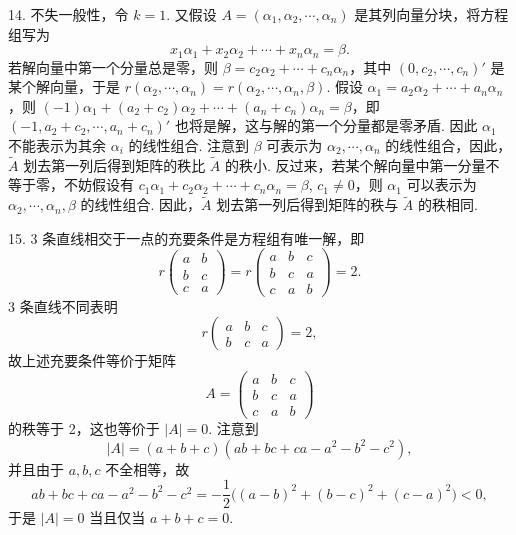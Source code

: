 \documentclass[UTF8,12pt,a4paper,fontset=fandol]{ctexart}
\begin{document}
14. 不失一般性，令 $k=1$. 又假设 $A=(\alpha_1,\alpha_2,\cdots,\alpha_n)$ 是其列向量分块，将方程组写为
\[
x_1\alpha_1+x_2\alpha_2+\cdots+x_n\alpha_n=\beta.
\]
若解向量中第一个分量总是零，则 $\beta=c_2\alpha_2+\cdots+c_n\alpha_n$，其中 $(0,c_2,\cdots,c_n)'$ 是某个解向量，于是 $r(\alpha_2,\cdots,\alpha_n)=r(\alpha_2,\cdots,\alpha_n,\beta)$. 假设 $\alpha_1=a_2\alpha_2+\cdots+a_n\alpha_n$，则 $(-1)\alpha_1+(a_2+c_2)\alpha_2+\cdots+(a_n+c_n)\alpha_n=\beta$，即 $(-1,a_2+c_2,\cdots,a_n+c_n)'$ 也将是解，这与解的第一个分量都是零矛盾. 因此 $\alpha_1$ 不能表示为其余 $\alpha_i$ 的线性组合. 注意到 $\beta$ 可表示为 $\alpha_2,\cdots,\alpha_n$ 的线性组合，因此，$\widetilde{A}$ 划去第一列后得到矩阵的秩比 $\widetilde{A}$ 的秩小. 反过来，若某个解向量中第一分量不等于零，不妨假设有 $c_1\alpha_1+c_2\alpha_2+\cdots+c_n\alpha_n=\beta$, $c_1\ne 0$，则 $\alpha_1$ 可以表示为 $\alpha_2,\cdots,\alpha_n,\beta$ 的线性组合. 因此，$\widetilde{A}$ 划去第一列后得到矩阵的秩与 $\widetilde{A}$ 的秩相同.

15. 3 条直线相交于一点的充要条件是方程组有唯一解，即
\[
r\begin{pmatrix}
a&b\\
b&c\\
c&a
\end{pmatrix}
=
r\begin{pmatrix}
a&b&c\\
b&c&a\\
c&a&b
\end{pmatrix}
=2.
\]
3 条直线不同表明
\[
r\begin{pmatrix}
a&b&c\\
b&c&a
\end{pmatrix}=2,
\]
故上述充要条件等价于矩阵
\[
A=\begin{pmatrix}
a&b&c\\
b&c&a\\
c&a&b
\end{pmatrix}
\]
的秩等于 2，这也等价于 $|A|=0$. 注意到
\[
|A|=(a+b+c)(ab+bc+ca-a^2-b^2-c^2),
\]
并且由于 $a,b,c$ 不全相等，故
\[
ab+bc+ca-a^2-b^2-c^2=-\frac12\bigl((a-b)^2+(b-c)^2+(c-a)^2\bigr)<0,
\]
于是 $|A|=0$ 当且仅当 $a+b+c=0$.
\end{document}
